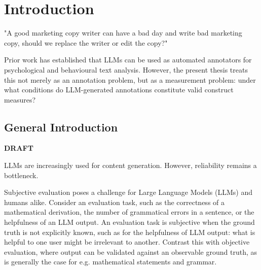 
\section{Introduction}

"A good marketing copy writer can have a bad day and write bad marketing copy, should we replace the writer or edit the copy?" 

Prior work has established that LLMs can be used as automated annotators for psychological and behavioural text analysis. However, the present thesis treats this not merely as an annotation problem, but as a measurement problem: under what conditions do LLM-generated annotations constitute valid construct measures? \citep{feuerriegelUsingNaturalLanguage2025}




\subsection{General Introduction}



\textbf{DRAFT} 

LLMs are increasingly used for content generation. However, reliability remains a bottleneck.

Subjective evaluation poses a challenge for Large Language Models (LLMs) and humans alike. Consider an evaluation task, such as the correctness of a mathematical derivation, the number of grammatical errors in a sentence, or the helpfulness of an LLM output. An evaluation task is subjective when the ground truth is not explicitly known, such as for the helpfulness of LLM output: what is helpful to one user might be irrelevant to another. Contrast this with objective evaluation, where output can be validated against an observable ground truth, as is generally the case for e.g. mathematical statements and grammar. 

